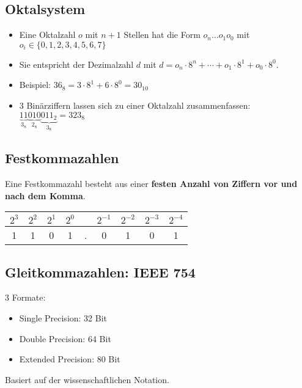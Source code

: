 \documentclass[12pt]{article}
\begin{document}
\subsection{Oktalsystem}
\begin{itemize}[leftmargin=*]
    \item[] Eine Oktalzahl $o$ mit $n + 1$ Stellen hat die Form $o_n \dots o_1 o_0$ mit $o_i \in \{0, 1, 2, 3, 4, 5, 6, 7\}$
    \item[] Sie entspricht der Dezimalzahl $d$ mit $d = o_n \cdot 8^n + \cdots + o_1 \cdot 8^1 + o_0 \cdot 8^0$.
    \item[] Beispiel: $36_8 = 3 \cdot 8^1 + 6 \cdot 8^0 = 30_{10}$
    \item[] 3 Binärziffern lassen sich zu einer Oktalzahl zusammenfassen:\\$\underbrace{11}_{3_8} \underbrace{010}_{2_8} \underbrace{011_2}_{3_8} = 323_8$
\end{itemize}
\subsection{Festkommazahlen}
Eine Festkommazahl besteht aus einer \textbf{festen Anzahl von Ziffern vor und nach dem Komma}.\\ \newline
\begin{tabular}{c|c|c|c|c|c|c|c|c}
    $2^3$ & $2^2$ & $2^1$ & $2^0$ &  & $2^{-1}$ & $2^{-2}$ & $2^{-3}$ & $2^{-4}$ \\ \hline
    1 & 1 & 0 & 1 & . & 0 & 1 & 0 &1
\end{tabular}
\subsection{Gleitkommazahlen: IEEE 754}
3 Formate:
\begin{itemize}
    \item Single Precision: 32 Bit
    \item Double Precision: 64 Bit
    \item Extended Precision: 80 Bit
\end{itemize}
Basiert auf der wissenschaftlichen Notation.
\end{document}
